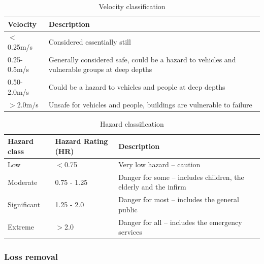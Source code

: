 \documentclass[APA,Times2COL]{WileyNJDv5}
\begin{document}
\setlength\tabcolsep{0pt}
\renewcommand{\arraystretch}{1.5} %
\begin{table}[h!]
\centering
\caption{Velocity classification \citep{environment2019risk}}
\begin{tabular}{C{3cm} C{14cm}} 
 \hline
 \textbf{Velocity} & \textbf{Description} \\ [0.5ex] 
  \hline
 $<$0.25m/s & Considered essentially still \\
 0.25-0.5m/s & Generally considered safe, could be a hazard to vehicles and vulnerable 
groups at deep depths \\
 0.50-2.0m/s & Could be a hazard to vehicles and people at deep depths\\
 $>$2.0m/s & Unsafe for vehicles and people, buildings are vulnerable to failure\\[1ex] 
 \hline
\end{tabular}
\label{table:velocity_cats}
\end{table}

\setlength\tabcolsep{0pt}
\renewcommand{\arraystretch}{1.5} %
\begin{table}[h!]
\centering
\caption{Hazard classification \citep{environment2019risk} }
\begin{tabular}{C{3cm} C{4cm} C{10cm}} 
 \hline
 \textbf{Hazard class} & \textbf{Hazard Rating (HR)} & \textbf{Description} \\ [0.5ex] 
 \hline
 Low & $<$0.75 & Very low hazard – caution \\
 Moderate & 0.75 - 1.25 & Danger for some – includes children, the elderly and the infirm\\
 Significant & 1.25 - 2.0 & Danger for most – includes the general public \\
 Extreme & $>$2.0 & Danger for all – includes the emergency services \\
 \hline
\end{tabular}
\label{table:hazard_cats}
\end{table}
\endgroup

\subsubsection{Loss removal}
\end{document}

